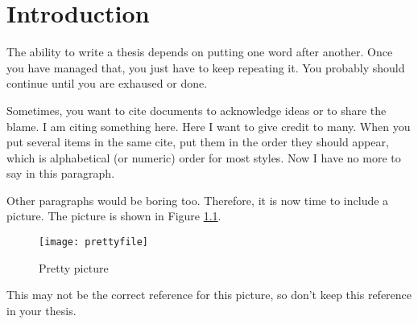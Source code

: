 %
%
%
% 
%


\chapter{Introduction}
\label{Introduction}

	
\indent 
The ability to write a thesis depends on putting one word after another.
Once you have managed that, you just have to keep repeating it.
You probably should continue until you are exhaused or done.

Sometimes, you want to cite documents to acknowledge ideas 
or to share the blame.  I am citing something here\cite{Levin:2007}.  
Here I want to give credit to many\cite{Levin:2007, Tran:2005, Ziegler:1991}.
When you put several items in the same cite, put them in the order 
they should appear, which is alphabetical (or numeric) order for most styles.
Now I have no more to say in this paragraph.

Other paragraphs would be boring too.
Therefore, it is now time to include a picture.  
The picture is shown in Figure \ref{PrettyPicture}.

\begin{figure}[tb]
    \centering
    \texttt{[image: prettyfile]}
    \caption{Pretty picture \cite{Levin:2007} }
    \label{PrettyPicture}
\end{figure}
	
This may not be the correct reference for this picture, so
don't keep this reference in your thesis.

